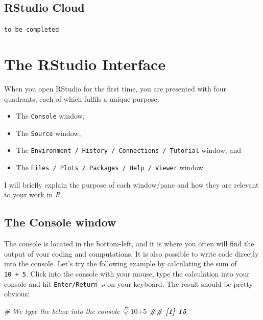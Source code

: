 \documentclass[
]{book}
\newenvironment{Shaded}{\begin{snugshade}}{\end{snugshade}}
\newcommand{\CommentTok}[1]{\textcolor[rgb]{0.56,0.35,0.01}{\textit{#1}}}
\newcommand{\DecValTok}[1]{\textcolor[rgb]{0.00,0.00,0.81}{#1}}
\newcommand{\DocumentationTok}[1]{\textcolor[rgb]{0.56,0.35,0.01}{\textbf{\textit{#1}}}}
\newcommand{\SpecialCharTok}[1]{\textcolor[rgb]{0.00,0.00,0.00}{#1}}
\begin{document}
\hypertarget{rstudio-cloud}{%
\section{RStudio Cloud}\label{rstudio-cloud}}

\texttt{to\ be\ completed}

\hypertarget{the-rstudio-interface}{%
\chapter{The RStudio Interface}\label{the-rstudio-interface}}

When you open RStudio for the first time, you are presented with four quadrants, each of which fulfils a unique purpose:

\begin{itemize}
\item
  The \texttt{Console} window,
\item
  The \texttt{Source} window,
\item
  The \texttt{Environment\ /\ History\ /\ Connections\ /\ Tutorial} window, and
\item
  The \texttt{Files\ /\ Plots\ /\ Packages\ /\ Help\ /\ Viewer} window
\end{itemize}

I will briefly explain the purpose of each window/pane and how they are relevant to your work in \emph{R}.

\hypertarget{the-console-window}{%
\section{The Console window}\label{the-console-window}}

The console is located in the bottom-left, and it is where you often will find the output of your coding and computations. It is also possible to write code directly into the console. Let's try the following example by calculating the sum of \texttt{10\ +\ 5}. Click into the console with your mouse, type the calculation into your console and hit \texttt{Enter/Return\ ↵} on your keyboard. The result should be pretty obvious:

\begin{Shaded}
\begin{Highlighting}[]
\CommentTok{\# We type the below into the console 👇}
\DecValTok{10}\SpecialCharTok{+}\DecValTok{5}
\DocumentationTok{\#\# [1] 15}
\end{Highlighting}
\end{Shaded}
\end{document}
